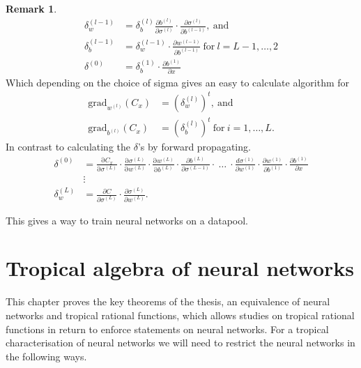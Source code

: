 \documentclass{article}
\theoremstyle{definition}
\newtheorem{remark}[theorem]{Remark}
\begin{document}
\begin{remark}
\begin{align*}
\delta^{(l-1)}_{w} &= \delta^{(l)}_{b} \frac{\partial b^{(l)}}{\partial \sigma^{(l)}} \cdot \frac{\partial \sigma^{(l)}}{\partial b^{(l-1)}}, \ \text{and} \\
\delta^{(l-1)}_{b} &= \delta^{(l-1)}_{w} \cdot \frac{\partial w^{(l-1)}}{\partial b^{(l-1)}} \ \text{for} \ l=L-1, \dots, 2 \\
\delta^{(0)} &= \delta^{(1)}_{b} \cdot \frac{\partial b^{(1)}}{\partial x}
\end{align*}
Which depending on the choice of sigma gives an easy to calculate algorithm for
\begin{align*}
\text{grad}_{w^{(l)}}(C_{x}) &= (\delta_{w}^{(l)})^{t}, \ \text{and} \\
\text{grad}_{b^{(l)}}(C_{x}) &= (\delta_{b}^{(l)})^{t} \ \text{for} \ i=1,\dots , L.
\end{align*}
In contrast to calculating the $\delta$'s by forward propagating.
\begin{align*}
\delta^{(0)} &= \frac{\mathrm \partial C_{x}}{\mathrm \partial \sigma^{(L)}} \cdot \frac{\mathrm \partial \sigma^{(L)}}{\mathrm \partial w^{(L)}} \cdot \frac{\mathrm \partial w^{(L)}}{\mathrm \partial b^{(L)}} \cdot \frac{\partial b^{(L)}}{\partial \sigma^{(L-1)}} \cdot \ \ldots \ \cdot \frac{d \sigma^{(1)}}{\partial w^{(1)}} \cdot \frac{\partial w^{(1)}}{\partial b^{(1)}} \cdot \frac{\partial b^{(1)}}{\partial x} \\
&\vdots \\
\delta^{(L)}_{w} &= \frac{\partial C}{\partial \sigma^{(L)}} \cdot \frac{\partial \sigma^{(L)}}{\partial w^{(L)}}.
\end{align*}

\end{remark}



This gives a way to train neural networks on a datapool.

\newpage

\section{Tropical algebra of neural networks}\label{sec:trop_netw}

This chapter proves the key theorems of the thesis, an equivalence of neural networks and tropical rational functions, which allows studies on tropical rational functions in return to enforce statements on neural networks. For a tropical characterisation of neural networks we will need to restrict the neural networks in the following ways.
\end{document}
